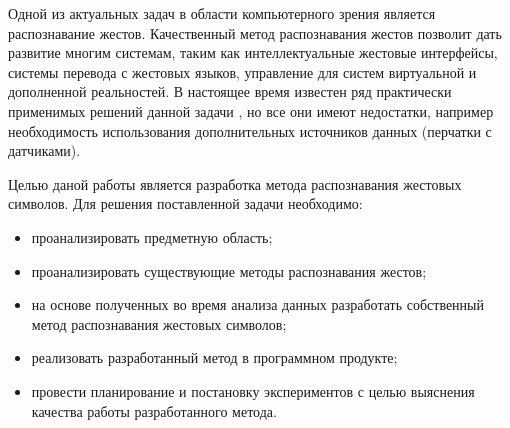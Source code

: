 \Introduction

Одной из актуальных задач в области компьютерного зрения является распознавание жестов. Качественный метод распознавания жестов позволит дать развитие многим системам, таким как интеллектуальные жестовые интерфейсы, системы перевода с жестовых языков, управление для систем виртуальной и дополненной реальностей. В настоящее время известен ряд практически применимых решений данной задачи \cite{Suharjito}, но все они имеют недостатки, например необходимость использования дополнительных источников данных (перчатки с датчиками).

Целью даной работы является разработка метода распознавания жестовых символов. Для решения поставленной задачи необходимо:

\begin{itemize}
	\item проанализировать предметную область;
	\item проанализировать существующие методы распознавания жестов;
	\item на основе полученных во время анализа данных разработать собственный метод распознавания жестовых символов;
	\item реализовать разработанный метод в программном продукте;
	\item провести планирование и постановку экспериментов с целью выяснения качества работы разработанного метода.
\end{itemize}